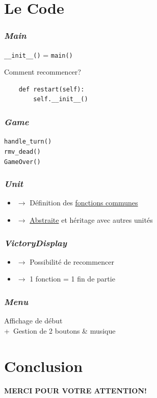 \documentclass[12pt]{beamer}
\begin{document}
    \section{Le Code} %
        
        \begin{frame}[fragile]
            \frametitle{\emph{Main}}\centering
            \pause
            \texttt{\_\_init\_\_()} = \texttt{main()}
            \pause
            \begin{block}{Comment recommencer?}
                \begin{verbatim}
    def restart(self):
        self.__init__()
                \end{verbatim}
            \end{block}
        \end{frame}
        \begin{frame}
            \frametitle{\emph{Game}}\centering
            \pause
            \texttt{handle\_turn()}\\
            \pause
            \texttt{rmv\_dead()}\\
            \pause
            \texttt{GameOver()}
        \end{frame}
        \begin{frame}
            \frametitle{\emph{Unit}}\centering
            \pause
            \begin{itemize}
                \item{$\rightarrow$} Définition des \underline{fonctions communes}
                \pause
                \item{$\rightarrow$} \underline{Abstraite} et héritage avec autres unités
            \end{itemize}
        \end{frame}
        \begin{frame}
            \frametitle{\emph{VictoryDisplay}}\centering
            \pause
            \begin{itemize}
                \item{$\rightarrow$} Possibilité de recommencer
                \pause
                \item{$\rightarrow$} 1 fonction = 1 fin de partie %
            \end{itemize}
        \end{frame}
        \begin{frame}
            \frametitle{\emph{Menu}}\centering %
            \pause
            Affichage de début\\
            +~Gestion de 2 boutons \&{} musique
        \end{frame}

    \section{Conclusion} %
        
        \begin{frame}\thispagestyle{empty}\centering
            \Huge
            \textbf{MERCI POUR VOTRE ATTENTION!}
        \end{frame}
\end{document}
